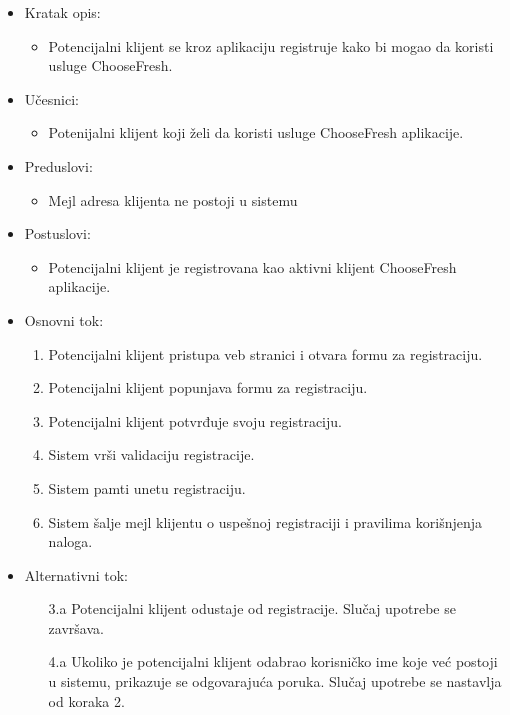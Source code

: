 
\begin{itemize}
    \item Kratak opis:
        \begin{itemize}
            \item Potencijalni klijent se kroz aplikaciju registruje kako bi mogao da koristi usluge ChooseFresh.
        \end{itemize}
    \item Učesnici:
        \begin{itemize}
            \item Potenijalni klijent koji želi da koristi usluge ChooseFresh aplikacije.
        \end{itemize}
    \item Preduslovi:
        \begin{itemize}
            \item Mejl adresa klijenta ne postoji u sistemu
        \end{itemize}
    \item Postuslovi:
        \begin{itemize}
            \item Potencijalni klijent je registrovana kao aktivni klijent ChooseFresh aplikacije.
        \end{itemize}
    \item Osnovni tok:
        \begin{enumerate}
            \item Potencijalni klijent pristupa veb stranici i otvara formu za registraciju.
            \item Potencijalni klijent popunjava formu za registraciju.
            \item Potencijalni klijent potvrđuje svoju registraciju.
            \item Sistem vrši validaciju registracije.
            \item Sistem pamti unetu registraciju.
            \item Sistem šalje mejl klijentu o uspešnoj registraciji i pravilima korišnjenja naloga.
        \end{enumerate}
    \item Alternativni tok:
        \begin{itemize}
            \item[3.a] Potencijalni klijent odustaje od registracije. Slučaj upotrebe se završava.
            \item[4.a] Ukoliko je potencijalni klijent odabrao korisničko ime koje već postoji u sistemu, prikazuje se odgovarajuća poruka. Slučaj upotrebe se nastavlja od koraka 2.

\end{itemize}
\end{itemize}
